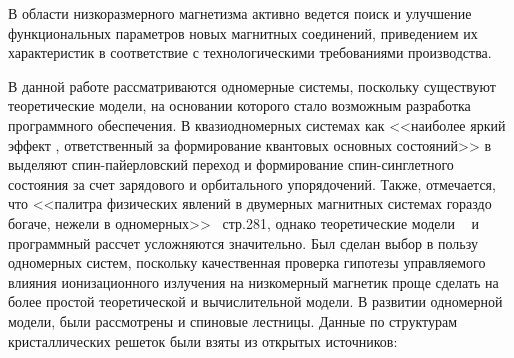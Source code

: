 \documentclass[11pt]{article}
\begin{document}
В области низкоразмерного магнетизма активно ведется поиск и улучшение функциональных параметров новых магнитных соединений, приведением их характеристик в соответствие с технологическими требованиями производства. 

В данной работе рассматриваются одномерные системы, поскольку существуют теоретические модели, на основании которого стало возможным разработка программного обеспечения. В квазиодномерных системах как <<наиболее яркий эффект , ответственный за формирование квантовых основных состояний>> в ~\cite{nm} выделяют спин-пайерловский переход и формирование спин-синглетного состояния за счет зарядового и орбитального упорядочений. Также, отмечается, что <<палитра физических явлений в двумерных магнитных системах гораздо богаче, нежели в одномерных>> ~\cite{nm}стр.281, однако теоретические модели ~\cite{nm} и программный рассчет усложняются значительно. Был сделан выбор в пользу одномерных систем, поскольку качественная проверка гипотезы управляемого влияния ионизационного излучения на низкомерный магнетик проще сделать на более простой теоретической и вычислительной модели. В развитии одномерной модели, были рассмотрены и спиновые лестницы. Данные по структурам кристаллических решеток были взяты из открытых источников:
\end{document}
